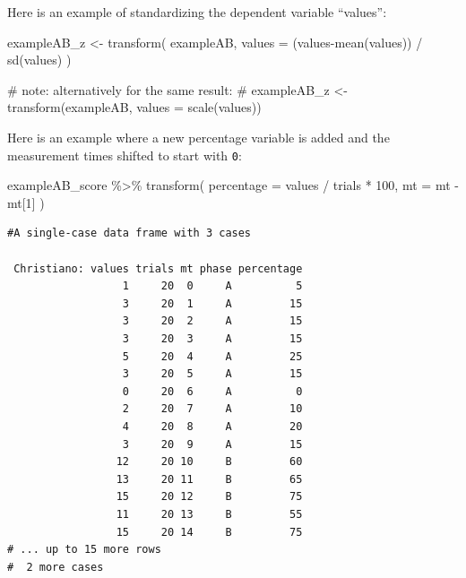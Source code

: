 \documentclass[
  letterpaper,
  DIV=11,
  numbers=noendperiod]{scrreprt}
\newenvironment{Shaded}{\begin{snugshade}}{\end{snugshade}}
\newcommand{\AttributeTok}[1]{\textcolor[rgb]{0.40,0.45,0.13}{#1}}
\newcommand{\CommentTok}[1]{\textcolor[rgb]{0.37,0.37,0.37}{#1}}
\newcommand{\DecValTok}[1]{\textcolor[rgb]{0.68,0.00,0.00}{#1}}
\newcommand{\FunctionTok}[1]{\textcolor[rgb]{0.28,0.35,0.67}{#1}}
\newcommand{\NormalTok}[1]{\textcolor[rgb]{0.00,0.23,0.31}{#1}}
\newcommand{\OtherTok}[1]{\textcolor[rgb]{0.00,0.23,0.31}{#1}}
\newcommand{\SpecialCharTok}[1]{\textcolor[rgb]{0.37,0.37,0.37}{#1}}
\begin{document}
Here is an example of standardizing the dependent variable ``values'':

\begin{Shaded}
\begin{Highlighting}[]
\NormalTok{exampleAB\_z }\OtherTok{\textless{}{-}} \FunctionTok{transform}\NormalTok{(}
\NormalTok{  exampleAB, }\AttributeTok{values =}\NormalTok{ (values}\SpecialCharTok{{-}}\FunctionTok{mean}\NormalTok{(values)) }\SpecialCharTok{/} \FunctionTok{sd}\NormalTok{(values)}
\NormalTok{)}

\CommentTok{\# note: alternatively for the same result:}
\CommentTok{\# exampleAB\_z \textless{}{-} transform(exampleAB, values = scale(values))}
\end{Highlighting}
\end{Shaded}

Here is an example where a new percentage variable is added and the
measurement times shifted to start with \texttt{0}:

\begin{Shaded}
\begin{Highlighting}[]
\NormalTok{exampleAB\_score }\SpecialCharTok{\%\textgreater{}\%}
  \FunctionTok{transform}\NormalTok{(}
    \AttributeTok{percentage =}\NormalTok{ values }\SpecialCharTok{/}\NormalTok{ trials }\SpecialCharTok{*} \DecValTok{100}\NormalTok{,}
    \AttributeTok{mt =}\NormalTok{ mt }\SpecialCharTok{{-}}\NormalTok{ mt[}\DecValTok{1}\NormalTok{]}
\NormalTok{  )}
\end{Highlighting}
\end{Shaded}

\begin{verbatim}
#A single-case data frame with 3 cases

 Christiano: values trials mt phase percentage
                  1     20  0     A          5
                  3     20  1     A         15
                  3     20  2     A         15
                  3     20  3     A         15
                  5     20  4     A         25
                  3     20  5     A         15
                  0     20  6     A          0
                  2     20  7     A         10
                  4     20  8     A         20
                  3     20  9     A         15
                 12     20 10     B         60
                 13     20 11     B         65
                 15     20 12     B         75
                 11     20 13     B         55
                 15     20 14     B         75
# ... up to 15 more rows
#  2 more cases
\end{verbatim}
\end{document}
